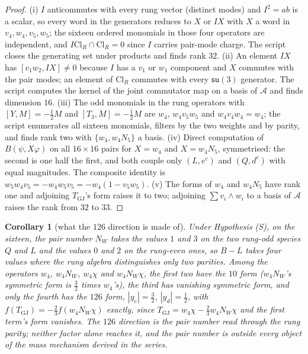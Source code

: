 \documentclass[11pt]{article}
\newtheorem{corollary}[theorem]{Corollary}
\theoremstyle{definition}
\newcommand{\Cl}{\mathrm{Cl}}
\newcommand{\su}{\mathfrak{su}}
\begin{document}
\begin{proof}
(i) $I$ anticommutes with every rung vector (distinct modes) and $I^{2} = ab$ is a scalar, so every word in the generators reduces to $X$ or $IX$ with $X$ a word in $v_{4}, w_{4}, v_{5}, w_{5}$; the sixteen ordered monomials in those four operators are independent, and $I\Cl_{R} \cap \Cl_{R} = 0$ since $I$ carries pair-mode charge. The script closes the generating set under products and finds rank $32$. (ii) An element $IX$ has $[v_{1}w_{2}, IX] \ne 0$ because $I$ has a $v_{1}$ or $w_{1}$ component and $X$ commutes with the pair modes; an element of $\Cl_{R}$ commutes with every $\su(3)$ generator. The script computes the kernel of the joint commutator map on a basis of $\mathcal{A}$ and finds dimension $16$. (iii) The odd monomials in the rung operators with $[Y, M] = -\tfrac12 M$ and $[T_{3}, M] = -\tfrac12 M$ are $w_{4}$, $w_{4}v_{5}w_{5}$ and $w_{4}v_{4}w_{4} = w_{4}$; the script enumerates all sixteen monomials, filters by the two weights and by parity, and finds rank two with $\{w_{4}, w_{4}N_{5}\}$ a basis. (iv) Direct computation of $B(\psi, X\varphi)$ on all $16 \times 16$ pairs for $X = w_{4}$ and $X = w_{4}N_{5}$, symmetrised: the second is one half the first, and both couple only $(L, e^{c})$ and $(Q, d^{c})$ with equal magnitudes. The composite identity is $w_{5}w_{4}v_{5} = -w_{4}w_{5}v_{5} = -w_{4}(1 - v_{5}w_{5})$. (v) The forms of $w_{4}$ and $w_{4}N_{5}$ have rank one and adjoining $T_{\mathrm{GJ}}$'s form raises it to two; adjoining $\sum v_{i} \wedge w_{i}$ to a basis of $\mathcal{A}$ raises the rank from $32$ to $33$.
\end{proof}

\begin{corollary}[what the $126$ direction is made of]\label{cor:onetwentysix}
Under Hypothesis (S), on the sixteen, the pair number $N_{W}$ takes the values $1$ and $3$ on the two rung-odd species $Q$ and $L$ and the values $0$ and $2$ on the rung-even ones, so $B - L$ takes four values where the rung algebra distinguishes only two parities. Among the operators $w_{4}$, $w_{4}N_{W}$, $w_{4}\chi$ and $w_{4}N_{W}\chi$, the first two have the $10$ form ($w_{4}N_{W}$'s symmetric form is $\tfrac32$ times $w_{4}$'s), the third has vanishing symmetric form, and only the fourth has the $126$ form, $|y_{e}| = \tfrac32$, $|y_{d}| = \tfrac12$, with $f(T_{\mathrm{GJ}}) = -\tfrac23 f(w_{4}N_{W}\chi)$ exactly, since $T_{\mathrm{GJ}} = w_{4}\chi - \tfrac23 w_{4}N_{W}\chi$ and the first term's form vanishes. The $126$ direction is the pair number read through the rung parity; neither factor alone reaches it, and the pair number is outside every object of the mass mechanism derived in the series.
\end{corollary}
\end{document}
